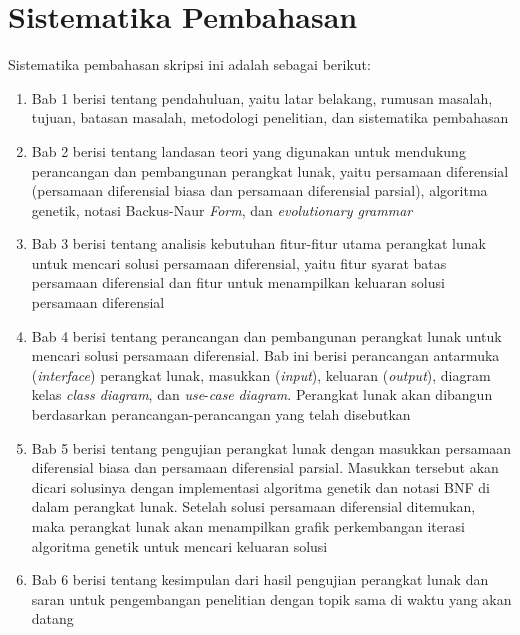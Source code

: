 \section{Sistematika Pembahasan}
\label{sec:sispem}

Sistematika pembahasan skripsi ini adalah sebagai berikut:

\begin{enumerate}
 	\item Bab 1 berisi tentang pendahuluan, yaitu latar belakang, rumusan masalah, tujuan, batasan masalah, metodologi penelitian, dan sistematika pembahasan
	\item Bab 2 berisi tentang landasan teori yang digunakan untuk mendukung perancangan dan pembangunan perangkat lunak, yaitu persamaan diferensial (persamaan diferensial biasa dan persamaan diferensial parsial), algoritma genetik, notasi Backus-Naur
	         \textit{Form}, dan \textit{evolutionary grammar}
	\item Bab 3 berisi tentang analisis kebutuhan fitur-fitur utama perangkat lunak untuk mencari solusi persamaan diferensial, yaitu fitur syarat batas persamaan diferensial dan fitur untuk menampilkan keluaran solusi persamaan diferensial
	\item Bab 4 berisi tentang perancangan dan pembangunan perangkat lunak untuk mencari solusi persamaan diferensial. Bab ini berisi perancangan antarmuka (\textit{interface}) perangkat lunak, masukkan (\textit{input}), keluaran (\textit{output}), diagram kelas
                   \textit{class diagram}, dan \textit{use}-\textit{case} \textit{diagram}. Perangkat lunak akan dibangun berdasarkan perancangan-perancangan yang telah disebutkan
	\item Bab 5 berisi tentang pengujian perangkat lunak dengan masukkan persamaan diferensial biasa dan persamaan diferensial parsial. Masukkan tersebut akan dicari solusinya dengan implementasi algoritma genetik dan notasi BNF di dalam perangkat lunak. Setelah
	         solusi persamaan diferensial ditemukan, maka perangkat lunak akan menampilkan grafik perkembangan iterasi algoritma genetik untuk mencari keluaran solusi
	\item Bab 6 berisi tentang kesimpulan dari hasil pengujian perangkat lunak dan saran untuk pengembangan penelitian dengan topik sama di waktu yang akan datang
\end{enumerate}